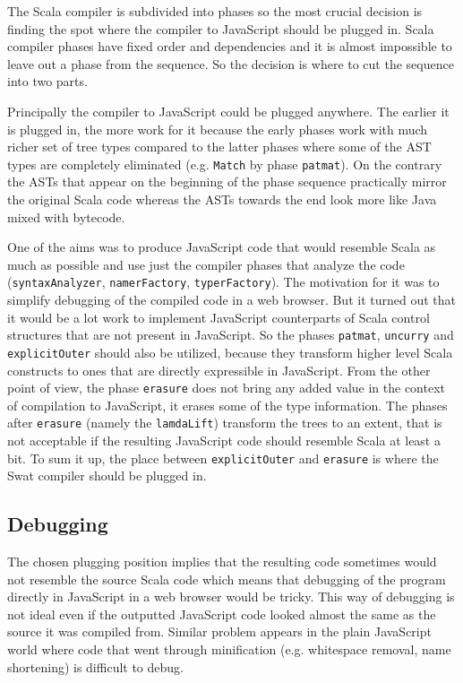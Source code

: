 \documentclass[12pt,a4paper]{report}
\begin{document}
The Scala compiler is subdivided into phases so the most crucial decision is finding the spot where the compiler to JavaScript should be plugged in. Scala compiler phases have fixed order and dependencies and it is almost impossible to leave out a phase from the sequence. So the decision is where to cut the sequence into two parts.

Principally the compiler to JavaScript could be plugged anywhere. The earlier it is plugged in, the more work for it because the early phases work with much richer set of tree types compared to the latter phases where some of the AST types are completely eliminated (e.g. \texttt{Match} by phase \texttt{patmat}). On the contrary the ASTs that appear on the beginning of the phase sequence practically mirror the original Scala code whereas the ASTs towards the end look more like Java mixed with bytecode.

One of the aims was to produce JavaScript code that would resemble Scala as much as possible and use just the compiler phases that analyze the code (\texttt{syntaxAnalyzer}, \texttt{namerFactory}, \texttt{typerFactory}). The motivation for it was to simplify debugging of the compiled code in a web browser. But it turned out that it would be a lot work to implement JavaScript counterparts of Scala control structures that are not present in JavaScript. So the phases \texttt{patmat}, \texttt{uncurry} and \texttt{explicitOuter} should also be utilized, because they transform higher level Scala constructs to ones that are directly expressible in JavaScript. From the other point of view, the phase \texttt{erasure} does not bring any added value in the context of compilation to JavaScript, it erases some of the type information. The phases after \texttt{erasure} (namely the \texttt{lamdaLift}) transform the trees to an extent, that is not acceptable if the resulting JavaScript code should resemble Scala at least a bit. To sum it up, the place between \texttt{explicitOuter} and \texttt{erasure} is where the Swat compiler should be plugged in.

\subsection{Debugging}

The chosen plugging position implies that the resulting code sometimes would not resemble the source Scala code which means that debugging of the program directly in JavaScript in a web browser would be tricky. This way of debugging is not ideal even if the outputted JavaScript code looked almost the same as the source it was compiled from. Similar problem appears in the plain JavaScript world where code that went through minification (e.g. whitespace removal, name shortening) is difficult to debug.
\end{document}

